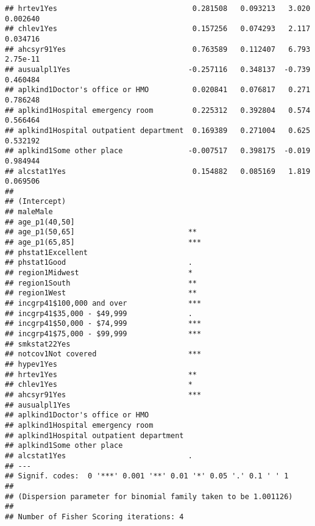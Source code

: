 \documentclass[]{article}
\begin{document}
\begin{verbatim}
## hrtev1Yes                               0.281508   0.093213   3.020 0.002640
## chlev1Yes                               0.157256   0.074293   2.117 0.034716
## ahcsyr91Yes                             0.763589   0.112407   6.793 2.75e-11
## ausualpl1Yes                           -0.257116   0.348137  -0.739 0.460484
## aplkind1Doctor's office or HMO          0.020841   0.076817   0.271 0.786248
## aplkind1Hospital emergency room         0.225312   0.392804   0.574 0.566464
## aplkind1Hospital outpatient department  0.169389   0.271004   0.625 0.532192
## aplkind1Some other place               -0.007517   0.398175  -0.019 0.984944
## alcstat1Yes                             0.154882   0.085169   1.819 0.069506
##                                           
## (Intercept)                               
## maleMale                                  
## age_p1(40,50]                             
## age_p1(50,65]                          ** 
## age_p1(65,85]                          ***
## phstat1Excellent                          
## phstat1Good                            .  
## region1Midwest                         *  
## region1South                           ** 
## region1West                            ** 
## incgrp41$100,000 and over              ***
## incgrp41$35,000 - $49,999              .  
## incgrp41$50,000 - $74,999              ***
## incgrp41$75,000 - $99,999              ***
## smkstat22Yes                              
## notcov1Not covered                     ***
## hypev1Yes                                 
## hrtev1Yes                              ** 
## chlev1Yes                              *  
## ahcsyr91Yes                            ***
## ausualpl1Yes                              
## aplkind1Doctor's office or HMO            
## aplkind1Hospital emergency room           
## aplkind1Hospital outpatient department    
## aplkind1Some other place                  
## alcstat1Yes                            .  
## ---
## Signif. codes:  0 '***' 0.001 '**' 0.01 '*' 0.05 '.' 0.1 ' ' 1
## 
## (Dispersion parameter for binomial family taken to be 1.001126)
## 
## Number of Fisher Scoring iterations: 4
\end{verbatim}
\end{document}
